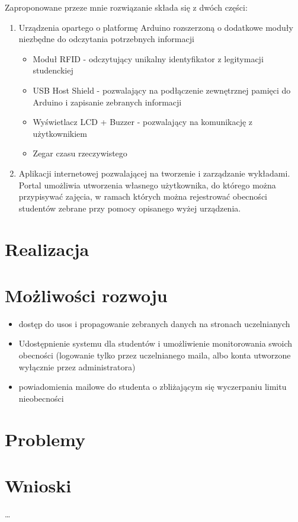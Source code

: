 \documentclass[declaration,shortabstract, mgr]{iithesis}
\begin{document}
\indent Zaproponowane przeze mnie rozwiązanie składa się z dwóch części:
\begin{enumerate}
\item Urządzenia opartego o platformę Arduino rozszerzoną o dodatkowe moduły niezbędne do odczytania potrzebnych informacji
\begin{itemize}
\item Moduł RFID - odczytujący unikalny identyfikator z legitymacji studenckiej
\item USB Host Shield - pozwalający na podłączenie zewnętrznej pamięci do Arduino i zapisanie zebranych informacji
\item Wyświetlacz LCD + Buzzer - pozwalający na komunikację z użytkownikiem
\item Zegar czasu rzeczywistego
\end{itemize}
\item Aplikacji internetowej pozwalającej na tworzenie i zarządzanie wykładami. Portal umożliwia utworzenia własnego użytkownika, do którego można przypisywać zajęcia, w ramach których można rejestrować obecności studentów
zebrane przy pomocy opisanego wyżej urządzenia.
\end{enumerate}

\chapter{Realizacja}
\chapter{Możliwości rozwoju}
\begin{itemize}
\item dostęp do usos i propagowanie zebranych danych na stronach uczelnianych
\item Udostępnienie systemu dla studentów i umożliwienie monitorowania swoich obecności (logowanie tylko przez uczelnianego maila, albo konta utworzone wyłącznie przez administratora)
\item powiadomienia mailowe do studenta o zbliżającym się wyczerpaniu limitu nieobecności
\end{itemize}

\chapter{Problemy}
\chapter{Wnioski}

\ldots


\end{document}
